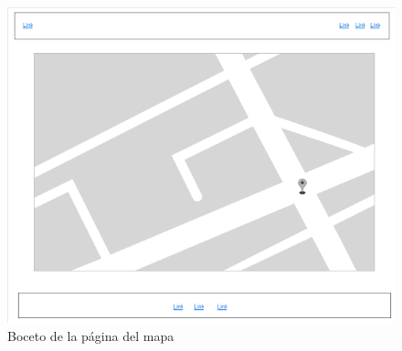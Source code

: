 \newpage

\begin{figure}[!ht]
  \begin{center}
  \includegraphics[scale=0.65]{../images/diag_plan/ui_mapa.png}
  \caption{Boceto de la página del mapa}
  \label{fig:i2}
  \end{center}
\end{figure}
